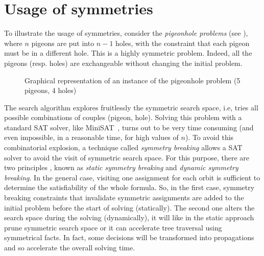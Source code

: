 \section{Usage of symmetries}

To illustrate the usage of symmetries, consider the \textit{pigeonhole problems} (see ), where $n$ pigeons are put into $n-1$ holes, with the constraint that each pigeon must be in a different hole. This is a
highly symmetric problem. Indeed, all the pigeons (resp. holes) are exchangeable
without changing the initial problem.
\begin{figure}[!htbp]
 \centering
 \caption{Graphical representation of an instance of the pigeonhole problem (5 pigeons, 4 holes)}
 \label{fig:hole}
\end{figure}
The search algorithm explores
fruitlessly the symmetric search space, i.e, tries all possible combinations of couples (pigeon, hole).
Solving this problem with a standard SAT solver, like MiniSAT~\cite{een2003extensible},
 turns out to be very time consuming (and even impossible, in a reasonable time, for high values of $n$). 
To avoid this combinatorial explosion, a technique called \emph{symmetry breaking} allows a SAT solver to avoid the visit of symmetric search space. For this purpose, there are two principles , known as \emph{static symmetry breaking}
and \emph{dynamic symmetry breaking}. In the general case, visiting one assignment for each orbit is sufficient to determine the satisfiability of the whole formula.
So, in the first case, symmetry breaking constraints that invalidate symmetric assignments are added to the initial problem before the start of solving (statically). The second one alters
the search space during the solving (dynamically), it will like in the static approach prune symmetric search space or it can accelerate tree traversal using symmetrical facts.
In fact, some decisions will be transformed into propagations and so accelerate the overall solving time.
  
